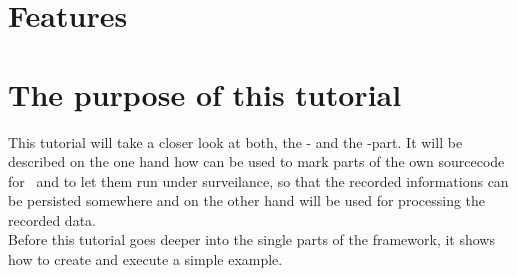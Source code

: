 	\section{Features}
	
	\section{The purpose of this tutorial}
		This tutorial will take a closer look at both, the \KiekerMonitoringPart - and the \KiekerAnalysisPart-part. It will be described on the one hand how \KiekerMonitoringPart  can be used to mark parts of the own sourcecode for \Kieker\  and to let them run under surveilance, so that the recorded informations can be persisted somewhere and on the other hand \KiekerAnalysisPart will be used for processing the recorded data.\\
		Before this tutorial goes deeper into the single parts of the framework, it shows how to create and execute a simple example.
